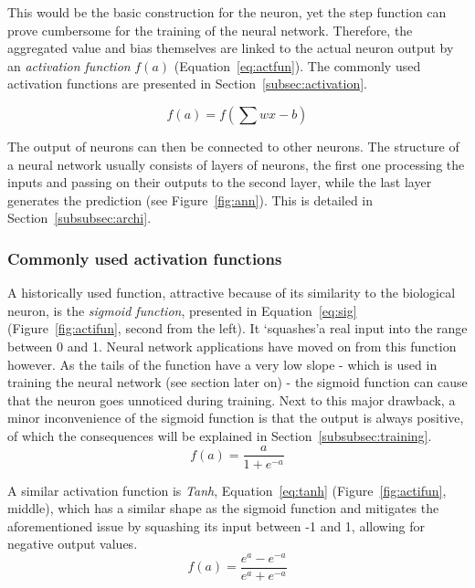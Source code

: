 This would be the basic construction for the neuron, yet the step function can prove cumbersome for the training of the neural network. Therefore, the aggregated value and bias themselves are linked to the actual neuron output by an \textit{activation function} $f(a)$ (Equation~\ref{eq:actfun}). The commonly used activation functions are presented in Section~\ref{subsec:activation}. 

\begin{equation} \label{eq:actfun}
f(a) = f\left(\sum{{wx}} - {b}\right)
\end{equation}

The output of neurons can then be connected to other neurons. The structure of a neural network usually consists of layers of neurons, the first one processing the inputs and passing on their outputs to the second layer, while the last layer generates the prediction (see Figure~\ref{fig:ann}). This is detailed in Section~\ref{subsubsec:archi}.


\subsubsection{Commonly used activation functions \label{subsec:activation}}
A historically used function, attractive because of its similarity to the biological neuron, is the \textit{sigmoid function}, presented in Equation~\ref{eq:sig} (Figure~\ref{fig:actifun}, second from the left). It `squashes\textquoteright  a real input into the range between 0 and 1. Neural network applications have moved on from this function however. As the tails of the function have a very low slope - which is used in training the neural network (see section later on) -  the sigmoid function can cause that the neuron goes unnoticed during training. Next to this major drawback, a minor inconvenience of the sigmoid function is that the output is always positive, of which the consequences will be explained in Section~\ref{subsubsec:training}.
\begin{equation} \label{eq:sig}
f(a) = \frac{a}{1+e^{-a}}
\end{equation}

A similar activation function is \textit{Tanh}, Equation~\ref{eq:tanh} (Figure~\ref{fig:actifun}, middle), which has a similar shape as the sigmoid function and mitigates the aforementioned issue by squashing its input between -1 and 1, allowing for negative output values. 
\begin{equation} \label{eq:tanh}
f(a) = \frac{e^{a}-e^{-a}}{e^{a}+e^{-a}}
\end{equation}

